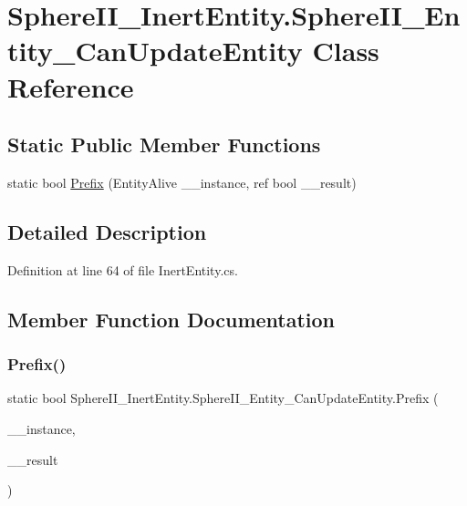 \hypertarget{class_sphere_i_i___inert_entity_1_1_sphere_i_i___entity___can_update_entity}{}\section{Sphere\+I\+I\+\_\+\+Inert\+Entity.\+Sphere\+I\+I\+\_\+\+Entity\+\_\+\+Can\+Update\+Entity Class Reference}
\label{class_sphere_i_i___inert_entity_1_1_sphere_i_i___entity___can_update_entity}
\subsection*{Static Public Member Functions}
\begin{DoxyCompactItemize}
\item 
static bool \mbox{\hyperlink{class_sphere_i_i___inert_entity_1_1_sphere_i_i___entity___can_update_entity_ad79f8f7637c9e733368132fbcc1540b6}{Prefix}} (Entity\+Alive \+\_\+\+\_\+instance, ref bool \+\_\+\+\_\+result)
\end{DoxyCompactItemize}


\subsection{Detailed Description}


Definition at line 64 of file Inert\+Entity.\+cs.



\subsection{Member Function Documentation}
\mbox{\label{class_sphere_i_i___inert_entity_1_1_sphere_i_i___entity___can_update_entity_ad79f8f7637c9e733368132fbcc1540b6}} 
\subsubsection{\texorpdfstring{Prefix()}{Prefix()}}
{\footnotesize\ttfamily static bool Sphere\+I\+I\+\_\+\+Inert\+Entity.\+Sphere\+I\+I\+\_\+\+Entity\+\_\+\+Can\+Update\+Entity.\+Prefix (\begin{DoxyParamCaption}\item[{Entity\+Alive}]{\+\_\+\+\_\+instance,  }\item[{ref bool}]{\+\_\+\+\_\+result }\end{DoxyParamCaption})\hspace{0.3cm}{\ttfamily [static]}}



